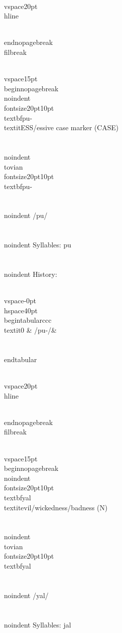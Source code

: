 \\vspace{20pt}\\hline

\\end{nopagebreak}
\\filbreak



\\vspace{15pt}
\\begin{nopagebreak}
\\noindent{\\fontsize{20pt}{10pt}\\textbf{pu-} } \\textit{ESS/essive case marker} (CASE)\\\\
\\noindent {\\tovian \\fontsize{20pt}{10pt} \\textbf{pu-} }\\\\
\\noindent /p{\textprimstress}u/\\\\
\\noindent Syllables: pu\\\\


\\noindent History:

\\vspace{-0pt}
\\hspace{40pt}
\\begin{tabular}{ccc}
\\textit{0} & /pu-/& \\\\
\\end{tabular}

\\vspace{20pt}\\hline

\\end{nopagebreak}
\\filbreak



\\vspace{15pt}
\\begin{nopagebreak}
\\noindent{\\fontsize{20pt}{10pt}\\textbf{yal} } \\textit{evil/wickedness/badness} (N)\\\\
\\noindent {\\tovian \\fontsize{20pt}{10pt} \\textbf{yal} }\\\\
\\noindent /y{\textprimstress}al/\\\\
\\noindent Syllables: jal\\\\


